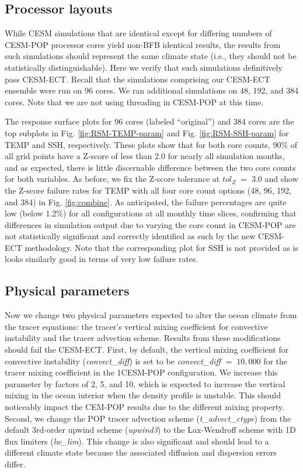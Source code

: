 \documentclass[gmd, manuscript]{copernicus}
\begin{document}
\subsection{Processor layouts}

While CESM simulations that are identical except for differing numbers of CESM-POP processor cores yield non-BFB identical results, the results from such simulations 
should represent the same climate state (i.e., they should not be statistically distinguishable). Here we verify that such simulations definitively pass CESM-ECT.  Recall that the simulations comprising our CESM-ECT ensemble were run on 96 cores.  We ran additional simulations on 48, 192, and 384 cores.  Note that we are not using threading in CESM-POP at this time.

The response surface plots for 96 cores (labeled ``original'') and 384 cores are the top subplots in Fig. \ref{fig:RSM-TEMP-param} and Fig. \ref{fig:RSM-SSH-param} for TEMP and SSH, respectively. These plots show that for both core counts, 90\% of all grid points have a Z-score of less than 2.0 for nearly all simulation months, and as expected, there is little discernable difference between the two core counts for both variables.  As before, we fix the Z-score tolerance at $tol_{Z} \; = \; 3.0$ and show the Z-score failure rates for TEMP with all four core count options (48, 96, 192, and 384) in Fig. \ref{fig:combine}.  As anticipated, the failure percentages are quite low (below 1.2\%) for all configurations at all monthly time slices, confirming that differences in simulation output due to varying the core count in CESM-POP are not statistically significant and correctly identified as such by the new CESM-ECT methodology.  Note that the corresponding plot for SSH is not provided as is looks similarly good in terms of very low failure rates.

 \subsection{Physical parameters}\label{sec:pp}

 Now we change two physical parameters expected to alter the ocean climate from the tracer equations: the tracer's vertical mixing coefficient for convective instability and the tracer advection scheme.  Results from these modifications should fail the CESM-ECT. First, by default, the vertical mixing coefficient for convective instability (\textit{convect\_diff}) is set to be \textit{convect\_diff} $=\; 10,000$ for the tracer mixing coefficient in the 1\degree CESM-POP configuration.  We increase this parameter by factors of 2, 5, and 10, which is expected to increase the vertical mixing in the ocean interior when the density profile is unstable. This should noticeably impact the CEM-POP results due to the different mixing property.  Second, we change the POP tracer advection scheme (\textit{t\_advect\_ctype}) from the default 3rd-order upwind scheme (\textit{upwind3}) to the Lax-Wendroff scheme with 1D flux limiters (\textit{lw\_lim}). This change is also significant and should lead to a different climate state because the associated diffusion and dispersion errors differ.
\end{document}
